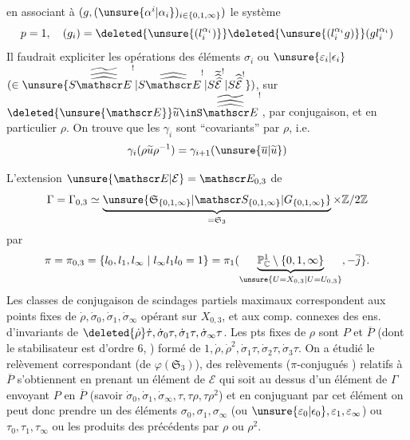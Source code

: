  en associant à $(g,(\unsure{\alpha^i|\alpha_i})_{i\in\{0,1,\infty\}})$ le système 
\[
p=1,\quad(g_i)=\deleted{\unsure{(l_i^{\alpha_i})}}\deleted{\unsure{(l_i^{\alpha_i}g)}}(gl_i^{\alpha_i})
\]
Il faudrait expliciter les opérations des éléments $\sigma_i$ ou $\unsure{\varepsilon_i|\epsilon_i}$  $(\in\unsure{S\widetilde{\widehat{\widehat{\mathscr E}}}^{!}|S\widehat{\widehat{\mathscr E}}^{!}|S\widetilde{\widehat{\widehat{\mathcal E}}}^{!}|S\widehat{\widehat{\mathcal E}}^{!}})$, sur $\deleted{\unsure{\mathscr E}}\widetilde u\inS\widetilde{\widehat{\widehat{\mathscr E}}}^{!}$,  par conjugaison, et en particulier $\rho$. On trouve que  les $\gamma_i$ sont ``covariants'' par $\rho$, i.e.
\[
\gamma_i(\rho\widetilde u\rho^{-1})=\gamma_{i+1}(\unsure{\overline u|\widetilde u})
\]

L'extension $\unsure{\mathscr E|\mathcal E}=\mathscr E_{0,3}$ de
\[
\Gamma=\Gamma_{0,3}\simeq\underbrace{\unsure{\mathfrak S_{\{0,1,\infty\}}|\mathscr S_{\{0,1,\infty\}}|G_{\{0,1,\infty\}}}}_{=\mathfrak S_3}\times\mathbb Z/2\mathbb Z
\]
par
\[
\pi=\pi_{0,3}=\{l_0,l_1,l_\infty\mid l_\infty l_1l_0=1\}=\pi_1(\underbrace{\mathbb P^1_{\mathbb C}\setminus\{0,1,\infty\}}_{\unsure{U=X_{0,3}|U=U_{0,3}}},-\overline j\}.
\]
Les classes de conjugaison  de scindages partiels maximaux correspondent aux points fixes de $\dot\rho,\dot\sigma_0,\dot\sigma_1,\dot\sigma_\infty$ opérant sur $X_{0,3}$, et aux comp. connexes des ens. d'invariants  de $\deleted{\dot\rho}\dot\tau,\dot\sigma_0\tau,\dot\sigma_1\tau,\dot\sigma_\infty\tau$. Les pts fixes de $\rho$ sont $P$ et $\overline P$ (dont le stabilisateur est d'ordre 6, ) formé de $1,\dot\rho,\dot\rho^2,\dot\sigma_1\tau,\dot\sigma_2\tau,\dot\sigma_3\tau$. On a étudié le relèvement correspondant  (de $\varphi(\mathfrak S_3)$),  des relèvements ($\pi$-conjugués ) relatifs à $\overline P$ s'obtiennent en  prenant un élément de $\mathscr E$  qui soit au dessus d'un élément de $\Gamma$ envoyant $P$ en $\overline P$ (savoir $\dot\sigma_0,\dot\sigma_1,\dot\sigma_\infty,\tau,\tau\rho,\tau\rho^2$) et en conjuguant par cet élément on peut donc prendre  un des éléments $\sigma_0,\sigma_1,\sigma_\infty$ (ou $\unsure{\varepsilon_0|\epsilon_0},\varepsilon_1,\varepsilon_\infty$) ou $\tau_0,\tau_1,\tau_\infty$ ou les produits des précédents par  $\rho$ ou $\rho^2$.

